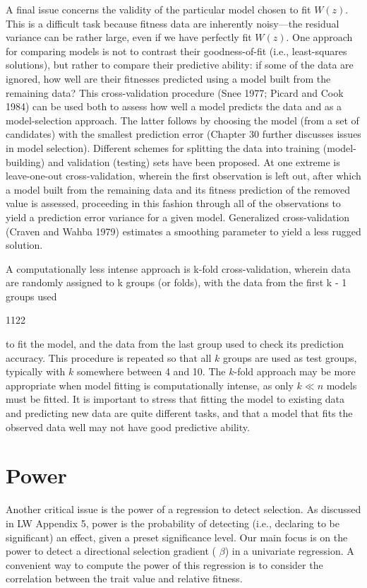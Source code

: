 \documentclass{article}
\begin{document}
A final issue concerns the validity of the particular model chosen to fit  $ W(z) $. This is a difficult task because fitness data are inherently noisy—the residual variance can be rather large, even if we have perfectly fit  $ W(z) $. One approach for comparing models is not to contrast their goodness-of-fit (i.e., least-squares solutions), but rather to compare their predictive ability: if some of the data are ignored, how well are their fitnesses predicted using a model built from the remaining data? This cross-validation procedure (Snee 1977; Picard and Cook 1984) can be used both to assess how well a model predicts the data and as a model-selection approach. The latter follows by choosing the model (from a set of candidates) with the smallest prediction error (Chapter 30 further discusses issues in model selection). Different schemes for splitting the data into training (model-building) and validation (testing) sets have been proposed. At one extreme is leave-one-out cross-validation, wherein the first observation is left out, after which a model built from the remaining data and its fitness prediction of the removed value is assessed, proceeding in this fashion through all of the observations to yield a prediction error variance for a given model. Generalized cross-validation (Craven and Wahba 1979) estimates a smoothing parameter to yield a less rugged solution.

A computationally less intense approach is k-fold cross-validation, wherein data are randomly assigned to k groups (or folds), with the data from the first k - 1 groups used

1122

to fit the model, and the data from the last group used to check its prediction accuracy. This procedure is repeated so that all $k$ groups are used as test groups, typically with $k$ somewhere between 4 and 10. The $k$-fold approach may be more appropriate when model fitting is computationally intense, as only $k \ll n$ models must be fitted. It is important to stress that fitting the model to existing data and predicting new data are quite different tasks, and that a model that fits the observed data well may not have good predictive ability.

\section{Power}
Another critical issue is the power of a regression to detect selection. As discussed in LW Appendix 5, power is the probability of detecting (i.e., declaring to be significant) an effect, given a preset significance level. Our main focus is on the power to detect a directional selection gradient ( $ \beta $) in a univariate regression. A convenient way to compute the power of this regression is to consider the correlation between the trait value and relative fitness.
\end{document}
